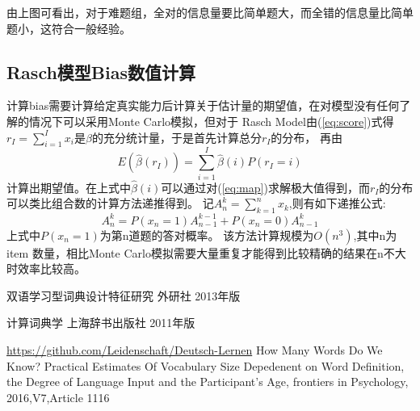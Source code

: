 \documentclass[12pt]{article}
\begin{document}
由上图可看出，对于难题组，全对的信息量要比简单题大，而全错的信息量比简单题小，这符合一般经验。
\subsection{Rasch模型Bias数值计算}\label{A5}
计算bias需要计算给定真实能力后计算关于估计量的期望值，在对模型没有任何了解的情况下可以采用Monte Carlo模拟，但对于
Rasch Model由(\ref{eq:score})式得$r_I=\displaystyle\sum_{i=1}^I x_i$是$\beta$的充分统计量，于是首先计算总分$r_I$的分布，
再由
\begin{equation}
E(\hat{\beta}(r_I))=\sum_{i=1}^I \hat{\beta}(i)P(r_I=i)
\end{equation}
计算出期望值。在上式中$\hat{\beta}(i)$可以通过对(\ref{eq:map})求解极大值得到，而$r_I$的分布可以类比组合数的计算方法递推得到。
记$A_n^k=\displaystyle\sum_{k=1}^n x_k$,则有如下递推公式:
\begin{equation}
A_n^k=P(x_n=1)A_{n-1}^{k-1}+P(x_n=0)A_{n-1}^k
\end{equation}
上式中$P(x_n=1)$为第n道题的答对概率。
该方法计算规模为$O(n^3)$,其中n为item 数量，相比Monte Carlo模拟需要大量重复才能得到比较精确的结果在n不大时效率比较高。
\begin{thebibliography}{}
 双语学习型词典设计特征研究
 外研社 
 2013年版

 计算词典学 
上海辞书出版社 
2011年版

 \url{https://github.com/Leidenschaft/Deutsch-Lernen}
 How Many Words Do We Know? Practical Estimates Of
Vocabulary Size Depedenent on Word Definition, the Degree of Language Input and the Participant's Age,		
frontiers in Psychology, 2016,V7,Article 1116
\end{thebibliography}
\end{document}

